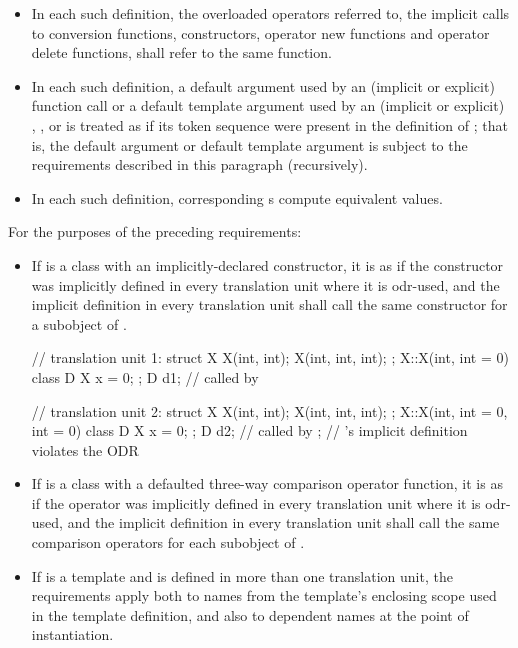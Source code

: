 \begin{itemize}
\item In each such definition, the overloaded operators referred
to, the implicit calls to conversion functions, constructors, operator
new functions and operator delete functions, shall refer to the same
function.

\item In each such definition,
a default argument used by an (implicit or explicit) function call or
a default template argument used by an (implicit or explicit)
,
, or
is treated as if its token sequence
were present in the definition of ;
that is, the default argument or default template argument
is subject to the requirements described in this paragraph (recursively).

\item In each such definition,
corresponding s
compute equivalent values.
\end{itemize}

\pnum
For the purposes of the preceding requirements:

\begin{itemize}
\item If  is a class with an implicitly-declared
constructor,
it is as if the constructor was
implicitly defined in every translation unit where it is odr-used, and the
implicit definition in every translation unit shall call the same
constructor for a subobject of .
\begin{example}
\begin{codeblock}
// translation unit 1:
struct X {
  X(int, int);
  X(int, int, int);
};
X::X(int, int = 0) { }
class D {
  X x = 0;
};
D d1;                           //  called by 

// translation unit 2:
struct X {
  X(int, int);
  X(int, int, int);
};
X::X(int, int = 0, int = 0) { }
class D {
  X x = 0;
};
D d2;                           //  called by ;
                                // 's implicit definition violates the ODR
\end{codeblock}
\end{example}

\item If  is a class with
a defaulted three-way comparison operator function,
it is as if the operator was
implicitly defined in every translation unit where it is odr-used, and the
implicit definition in every translation unit shall call the same
comparison operators for each subobject of .

\item
If  is a template and is defined in more than one
translation unit, the requirements
apply both to names from the template's enclosing scope used in the
template definition, and also to dependent names at
the point of instantiation.
\end{itemize}


